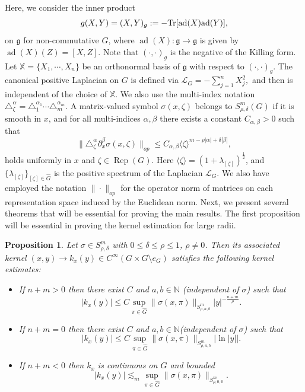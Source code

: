 \documentclass[12pt, reqno]{amsart}
\newtheorem{proposition}[theorem]{Proposition}
\theoremstyle{definition}
\theoremstyle{remark}
\numberwithin{equation}{section}
\begin{document}
Here, we consider the inner product $$g(X,Y)=(X,Y)_{g}:=-\textnormal{Tr}[\textnormal{ad}(X)\textnormal{ad}(Y)],$$ on $\mathfrak{g}$ for non-commutative $G$, where
\(\operatorname{ad}(X) : \mathfrak{g} \to \mathfrak{g}\) is given by
\(\operatorname{ad}(X)(Z) = [X,Z]\). Note that $(\cdot,\cdot)_{g}$ is the negative of the Killing form.  Let $\mathbb{X}=\{X_1,\cdots,X_n\}$ be an orthonormal basis of $\mathfrak{g}$ with respect to $(\cdot,\cdot)_{g}$. The canonical positive Laplacian on $G$ is defined via
$
    \mathcal{L}_G=-\sum_{j=1}^nX_j^2,
$ 
and then is independent of the choice of  $\mathbb{X}.$ We also use the multi-index notation $\triangle^\alpha_\zeta=\triangle^{\alpha_1}_{1}\cdots\triangle^{\alpha_m}_m$. A matrix-valued symbol $\sigma(x,\zeta)$ belongs to $S^m_{\rho,\delta}(G)$ if it is smooth in $x$, and for all multi-indices $\alpha,\beta$ there exists a constant $C_{\alpha,\beta}>0$ such that
\begin{equation*}
    \|\triangle_{\zeta}^\alpha\partial^{\beta}_{x}\sigma(x,\zeta)\|_{op}\leq C_{\alpha,\beta}\langle\zeta\rangle^{m-\rho|\alpha|+\delta|\beta|},
\end{equation*}
holds uniformly in $x$ and $\zeta\in\operatorname{Rep}(G)$. Here $\langle\zeta\rangle=(1+\lambda_{[\zeta]})^{\frac{1}{2}}$, and $\{\lambda_{[\zeta]}\}_{[\zeta]\in\widehat{G}}$ is the positive spectrum of the Laplacian $\mathcal{L}_{G}$. We also have employed the notation $\|\cdot\|_{op}$ for the operator norm of matrices on each representation space induced by the Euclidean norm. Next, we present several theorems that will be essential for proving the main results. The first proposition will be essential in proving the kernel estimation for large radii. 
\begin{proposition}\label{kernel}
    Let $\sigma\in S^m_{\rho,\delta}$ with $0 \leq\delta\leq\rho\leq 1$, $\rho\neq0$. Then its associated kernel $(x,y)\to k_x(y)\in C^{\infty}(G\times G\setminus{e_G})$ satisfies the following kernel estimates:
    \begin{itemize}
        \item If $n+m>0$ then there exist $C$ and $a,b\in\mathbb{N}$ (independent of $\sigma$) such that
        \begin{equation*}
            |k_x(y)|\leq C\sup_{\pi\in\widehat{G}}\|\sigma(x,\pi)\|_{S^{m}_{\rho,a,b}}|y|^{-\frac{n+m}{\rho}}.
        \end{equation*}
        \item If $n+m=0$ then there exist $C$ and $a,b\in\mathbb{N}$(independent of $\sigma$) such that
        \begin{equation*}
            |k_x(y)|\leq C\sup_{\pi\in\widehat{G}}\|\sigma(x,\pi)\|_{S^{m}_{\rho,a,b}}|\ln|y||.
        \end{equation*}
        \item If $n+m<0$ then $k_x$ is continuous on $G$ and bounded
        \begin{equation*}
            |k_x(y)|\lesssim_{m}\sup_{\pi\in\widehat{G}}\|\sigma(x,\pi)\|_{S^{m}_{\rho,0,0}}.
        \end{equation*}
    \end{itemize}
\end{proposition}
\end{document}
